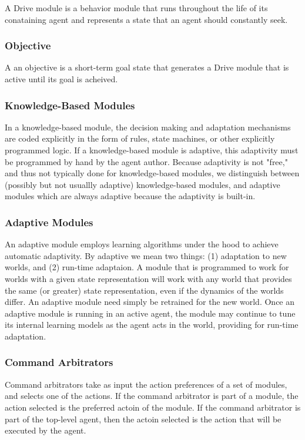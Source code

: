 A Drive module is a behavior module that runs throughout the life of
its conataining agent and represents a state that an agent should
constantly seek.


\subsubsection{Objective}

A an objective is a short-term goal state that generates a Drive module
that is active until its goal is acheived.


\subsubsection{Knowledge-Based Modules}

In a knowledge-based module, the decision making and adaptation
mechanisms are coded explicitly in the form of rules, state machines,
or other explicitly programmed logic.  If a knowledge-based module is
adaptive, this adaptivity must be programmed by hand by the agent
author.  Because adaptivity is not "free," and thus not typically done
for knowledge-based modules, we distinguish between (possibly but not
usuallly adaptive) knowledge-based modules, and adaptive modules which
are always adaptive because the adaptivity is built-in.


\subsubsection{Adaptive Modules}

An adaptive module employs learning algorithms under the hood to
achieve automatic adaptivity.  By adaptive we mean two things: (1)
adaptation to new worlds, and (2) run-time adaptaion.  A module that
is programmed to work for worlds with a given state representation
will work with any world that provides the same (or greater) state
representation, even if the dynamics of the worlds differ.  An
adaptive module need simply be retrained for the new world.  Once an
adaptive module is running in an active agent, the module may continue
to tune its internal learning models as the agent acts in the world,
providing for run-time adaptation.

\subsubsection{Command Arbitrators}

Command arbitrators take as input the action preferences of a set of
modules, and selects one of the actions.  If the command arbitrator is
part of a module, the action selected is the preferred actoin of the
module.  If the command arbitrator is part of the top-level agent,
then the actoin selected is the action that will be executed by the
agent.

